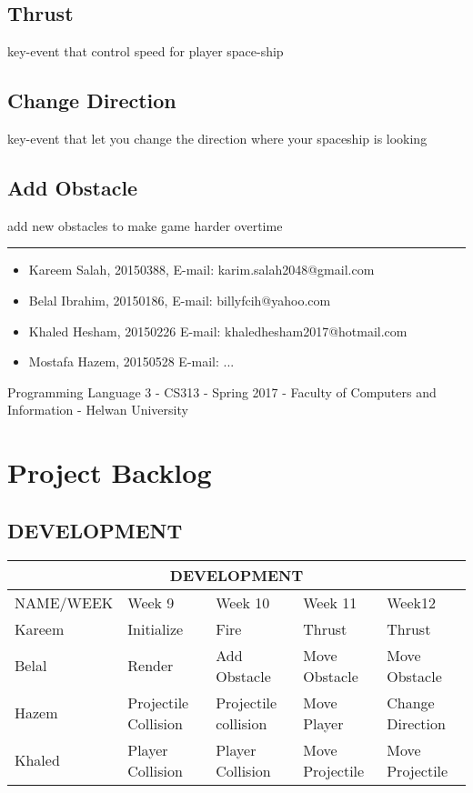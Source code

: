 \documentclass[]{article}
\begin{document}
\subsection{Thrust}
key-event that control speed for player space-ship

\subsection{Change Direction}
key-event that let you change the direction where your spaceship is looking

\subsection{Add Obstacle}
add new obstacles to make game harder overtime 

\noindent\rule{12cm}{0.5pt}

\begin{itemize}

  \item Kareem Salah, 20150388,
  \newline
  E-mail: karim.salah2048@gmail.com
  
  \item Belal Ibrahim, 20150186,
  \newline
  E-mail: billyfcih@yahoo.com
  
  \item Khaled Hesham, 20150226
  \newline
  E-mail: khaledhesham2017@hotmail.com
  
  \item Mostafa Hazem, 20150528
  \newline
  E-mail: ...
  
\end{itemize}
Programming Language 3 - CS313 - Spring 2017 - Faculty of
Computers and Information - Helwan University

\section{Project Backlog}

\subsection{DEVELOPMENT}

\begin{tabular}{|p{2.5cm}|p{3cm}|p{3cm}|p{3cm}|p{3cm}|}
 \hline
 \multicolumn{5}{|c|}{DEVELOPMENT} \\
 \hline
 NAME/WEEK & Week 9 & Week 10 & Week 11 & Week12\\
 \hline
 Kareem & Initialize & Fire & Thrust & Thrust \\
 \hline
 Belal& Render & Add Obstacle & Move Obstacle & Move Obstacle \\
 \hline
 Hazem & Projectile Collision & Projectile collision & Move Player & Change Direction\\
 \hline
 Khaled & Player Collision & Player Collision &  Move Projectile &Move Projectile\\
 \hline
\end{tabular}
\end{document}

